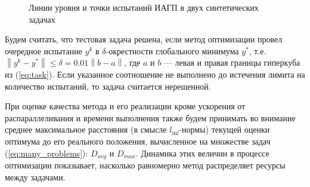 \begin{figure}[ht]
    \centering
    \caption{Линии уровня и точки испытаний ИАГП в двух синтетических задачах}
    \label{fig:isolines}
\end{figure}

Будем считать, что тестовая задача решена, если метод оптимизации провел очередное испытание \(y^k\) в
\(\delta\)-окрестности глобального минимума \(y^*\), т.е. $\left\|y^k-
y^*\right\|\leqslant \delta = 0.01\left\|b-a\right\|$, где \(a\) и \(b\) --- левая и правая границы гиперкуба из (\ref{eq:task}).
Если указанное соотношение не выполнено до истечения лимита на количество испытаний, то задача считается нерешенной.

При оценке качества метода и его реализации кроме ускорения от распараллеливания и времени выполнения также будем принимать во внимание среднее максимальное расстояния (в смысле \(l_{\inf}\)-нормы) текущей оценки оптимума до его реального положения,
вычисленное на множестве задач (\ref{eq:many_problems}): \(D_{avg}\) и \(D_{max}\). Динамика этих величин в процессе оптимизации
показывает, насколько равномерно метод распределяет ресурсы между задачами.

